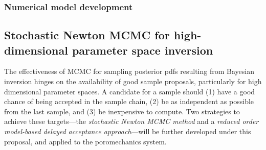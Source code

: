 \documentclass[11pt,final]{article}%
\begin{document}



\subsubsection{Numerical model development}\label{sec:num_darcy}

\subsection{Stochastic Newton MCMC for high-dimensional parameter
  space inversion} 
\label{sec:mcmc}


The effectiveness of MCMC for sampling posterior pdfs
resulting from Bayesian inversion hinges on the
availability of good sample proposals, particularly for high
dimensional parameter spaces. A candidate for a sample should (1) have
a good chance of being accepted in the sample chain, (2) be as
independent as possible from the last sample,
and (3) be inexpensive to compute. Two strategies to achieve these
targets---the {\em stochastic Newton MCMC method} and a {\em reduced
  order model-based delayed acceptance approach}---will be further
developed under this proposal, and applied to the poromechanics
system.
\end{document}
